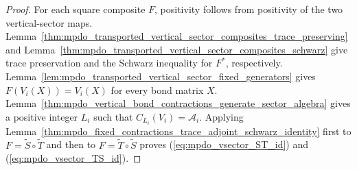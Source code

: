 \begin{proof}\leanok
    For each square composite $F$, positivity follows from positivity of the
    two vertical-sector maps.
    Lemma~\ref{thm:mpdo_transported_vertical_sector_composites_trace_preserving}
    and
    Lemma~\ref{thm:mpdo_transported_vertical_sector_composites_schwarz}
    give trace preservation and the Schwarz inequality for $F^*$,
    respectively.
    Lemma~\ref{lem:mpdo_transported_vertical_sector_fixed_generators} gives
    $F(V_i(X))=V_i(X)$ for every bond matrix $X$.
    Lemma~\ref{thm:mpdo_vertical_bond_contractions_generate_sector_algebra}
    gives a positive integer $L_i$ such that
    $C_{L_i}(V_i)=\mathcal A_i$.
    Applying
    Lemma~\ref{thm:mpdo_fixed_contractions_trace_adjoint_schwarz_identity}
    first to $F=\widetilde S\circ\widetilde T$ and then to
    $F=\widetilde T\circ\widetilde S$ proves
    (\ref{eq:mpdo_vsector_ST_id}) and
    (\ref{eq:mpdo_vsector_TS_id}).
\end{proof}
